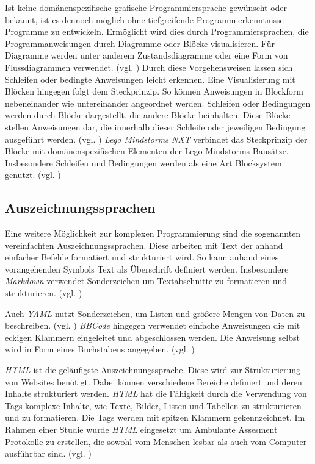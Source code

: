 Ist keine domänenspezifische grafische Programmiersprache gewünscht oder bekannt, ist es dennoch möglich ohne tiefgreifende Programmierkenntnisse Programme zu entwickeln. Ermöglicht wird dies durch Programmiersprachen, die Programmanweisungen durch Diagramme oder Blöcke visualisieren. Für Diagramme werden unter anderem Zustandsdiagramme oder eine Form von Flussdiagrammen verwendet. (vgl. \cite{SwissEdu45:online} \cite{DRAKONEd12:online} \cite{PureData15:online}) Durch diese Vorgehensweisen lassen sich Schleifen oder bedingte Anweisungen leicht erkennen. Eine Visualisierung mit Blöcken hingegen folgt dem Steckprinzip. So können Anweisungen in Blockform nebeneinander wie untereinander angeordnet werden. Schleifen oder Bedingungen werden durch Blöcke dargestellt, die andere Blöcke beinhalten. Diese Blöcke stellen Anweisungen dar, die innerhalb dieser Schleife oder jeweiligen Bedingung ausgeführt werden. (vgl. \cite{BlocklyG18:online} \cite{NXTSoftw71:online} \cite{SnapBuil34:online} \cite{squeakla50:online}) \emph{Lego Mindstorms NXT} verbindet das Steckprinzip der Blöcke mit domänenspezifischen Elementen der Lego Mindstorms Bausätze. Insbesondere Schleifen und Bedingungen werden als eine Art Blocksystem genutzt. (vgl. \cite{NXTSoftw71:online})


\subsection{Auszeichnungssprachen}
Eine weitere Möglichkeit zur komplexen Programmierung sind die sogenannten vereinfachten Auszeichnungssprachen. Diese arbeiten mit Text der anhand einfacher Befehle formatiert und strukturiert wird. So kann anhand eines vorangehenden Symbols Text als Überschrift definiert werden. Insbesondere \emph{Markdown} verwendet Sonderzeichen um Textabschnitte zu formatieren und strukturieren. (vgl. \cite{GettingS56:online}) 

Auch \emph{YAML} nutzt Sonderzeichen, um Listen und größere Mengen von Daten zu beschreiben. (vgl. \cite{TheOffic64:online}) \emph{BBCode} hingegen verwendet einfache Anweisungen die mit eckigen Klammern eingeleitet und abgeschlossen werden. Die Anweisung selbst wird in Form eines Buchstabens angegeben. (vgl. \cite{BBCodeor24:online})

\emph{HTML} ist die geläufigste Auszeichnungssprache. Diese wird zur Strukturierung von Websites benötigt. Dabei können verschiedene Bereiche definiert und deren Inhalte strukturiert werden. \emph{HTML} hat die Fähigkeit durch die Verwendung von Tags komplexe Inhalte, wie Texte, Bilder, Listen und Tabellen zu strukturieren und zu formatieren. Die Tags werden mit spitzen Klammern gekennzeichnet. Im Rahmen einer Studie wurde \emph{HTML} eingesetzt um Ambulante Assesment Protokolle zu erstellen, die sowohl vom Menschen lesbar als auch vom Computer ausführbar sind. (vgl. \cite{Batalas2018})



